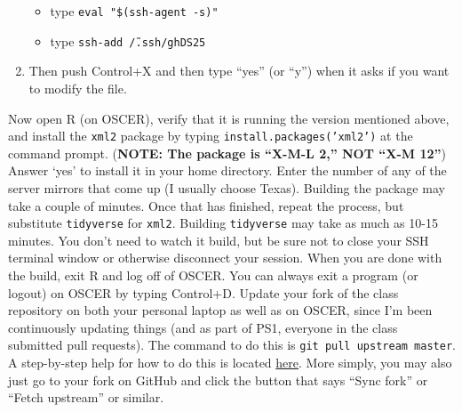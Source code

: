 \documentclass[12pt,english]{exam}
\begin{document}
\begin{questions}
\begin{enumerate}
        \begin{itemize}
        \item type \texttt{eval "\$(ssh-agent -s)"}
        \item type \texttt{ssh-add \~/.ssh/ghDS25}
        \end{itemize}
    \item Then push Control+X and then type ``yes'' (or ``y'') when it asks if you want to modify the file.
\end{enumerate}
\question Now open R (on OSCER), verify that it is running the version mentioned above, and install the \texttt{xml2} package by typing \texttt{install.packages('xml2')} at the command prompt. (\textbf{NOTE: The package is ``X-M-L 2,'' NOT ``X-M 12''}) Answer `yes' to install it in your home directory. Enter the number of any of the server mirrors that come up (I usually choose Texas). Building the package may take a couple of minutes. Once that has finished, repeat the process, but substitute \texttt{tidyverse} for \texttt{xml2}. Building \texttt{tidyverse} may take as much as 10-15 minutes. You don't need to watch it build, but be sure not to close your SSH terminal window or otherwise disconnect your session. When you are done with the build, exit R and log off of OSCER. You can always exit a program (or logout) on OSCER by typing Control+D.
\question Update your fork of the class repository on both your personal laptop as well as on OSCER, since I'm been continuously updating things (and as part of PS1, everyone in the class submitted pull requests). The command to do this is \texttt{git pull upstream master}. A step-by-step help for how to do this is located \href{https://help.github.com/articles/syncing-a-fork/}{here}. More simply, you may also just go to your fork on GitHub and click the button that says ``Sync fork'' or ``Fetch upstream'' or similar.
\end{questions}
\end{document}
